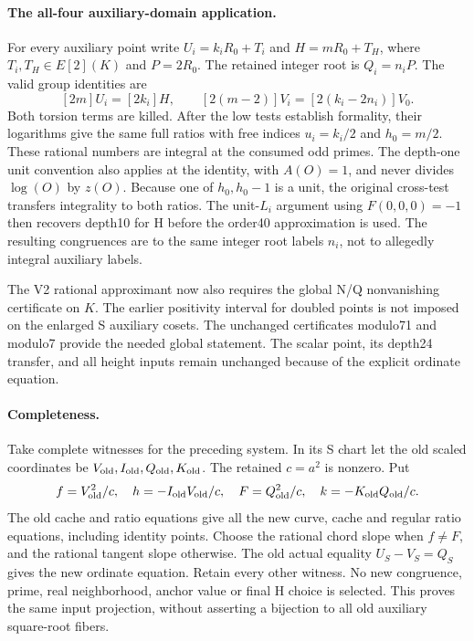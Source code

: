 \documentclass{article}
\begin{document}
\paragraph{The all-four auxiliary-domain application.}
For every auxiliary point write $U_i=k_iR_0+T_i$ and
$H=mR_0+T_H$, where $T_i,T_H\in E[2](K)$ and $P=2R_0$.
The retained integer root is $Q_i=n_iP$. The valid group identities are
\[
 [2m]U_i=[2k_i]H,\qquad
 [2(m-2)]V_i=[2(k_i-2n_i)]V_0.
\]
Both torsion terms are killed. After the low tests establish formality,
their logarithms give the same full ratios with free indices
$u_i=k_i/2$ and $h_0=m/2$. These rational numbers are integral at the
consumed odd primes. The depth-one unit convention also applies at
the identity, with $A(O)=1$, and never divides $\log(O)$ by $z(O)$.
Because one of $h_0,h_0-1$ is a unit, the original cross-test transfers
integrality to both ratios. The unit-$L_i$ argument using
$F(0,0,0)=-1$ then recovers depth10 for H before the order40
approximation is used. The resulting congruences are to the same
integer root labels $n_i$, not to allegedly integral auxiliary labels.

The V2 rational approximant now also requires the global N/Q
nonvanishing certificate on $K$. The earlier positivity interval for
doubled points is not imposed on the enlarged S auxiliary cosets.
The unchanged certificates modulo71 and modulo7 provide the needed
global statement. The scalar point, its depth24 transfer, and all
height inputs remain unchanged because of the explicit ordinate equation.

\paragraph{Completeness.}
Take complete witnesses for the preceding system. In its S chart let
the old scaled coordinates be $V_{\rm old},I_{\rm old},Q_{\rm old},
K_{\rm old}$. The retained $c=a^2$ is nonzero. Put
\[
 f=V_{\rm old}^2/c,\quad h=-I_{\rm old}V_{\rm old}/c,\quad
 F=Q_{\rm old}^2/c,\quad k=-K_{\rm old}Q_{\rm old}/c.
\]
The old cache and ratio equations give all the new curve, cache and
regular ratio equations, including identity points. Choose the rational
chord slope when $f\ne F$, and the rational tangent slope otherwise.
The old actual equality $U_S-V_S=Q_S$ gives the new ordinate equation.
Retain every other witness. No new congruence, prime, real neighborhood,
anchor value or final H choice is selected. This proves the same input
projection, without asserting a bijection to all old auxiliary
square-root fibers.
\end{document}
